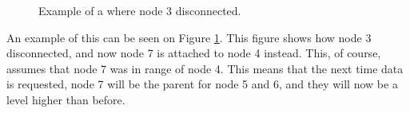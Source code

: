 \begin{figure}[!h]
	\centering
	\caption{Example of a where node 3 disconnected.}
	\label{fig:prottree2}
\end{figure}

An example of this can be seen on Figure \ref{fig:prottree2}. This figure shows how node 3 disconnected, and now node 7 is attached to node 4 instead. This, of course, assumes that node 7 was in range of node 4.
This means that the next time data is requested, node 7 will be the parent for node 5 and 6, and they will now be a level higher than before.